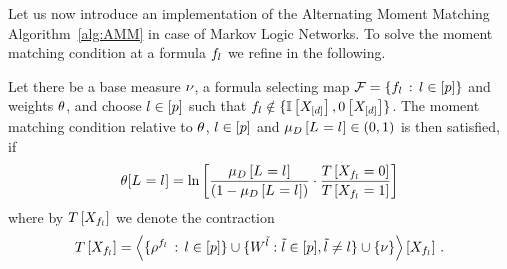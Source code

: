 Let us now introduce an implementation of the Alternating Moment Matching Algorithm~\ref{alg:AMM} in case of Markov Logic Networks.
To solve the moment matching condition at a formula $f_{l}$ we refine  in the following.

\begin{lemma}\label{ref:lemMMinMLN}
	Let there be a base measure $\nu$, a formula selecting map $\mathcal{F}=\{f_{l} \, : \, l\in[p]\}$ and weights $\theta$, and choose $l\in[p]$ such that $f_{l}  \notin \{\mathbb{I}\left[X_{[d]}\right],0\left[X_{[d]}\right]\}$.	
	The moment matching condition relative to $\theta$, $l\in[p]$ and $\mu_{D}\left[L_{}=l_{}\right]\in(0,1)$ is then satisfied, if
	\begin{align} \label{sol:momentMatchingExformula}
	 	\theta[L_{}=l_{}] = \ln \left[ 
		\frac{\mu_{D}\left[L_{}=l_{}\right]}{(1-\mu_{D}\left[L_{}=l_{}\right])} 
		\cdot \frac{T\left[X_{f_{l} }=0\right]}{T\left[X_{f_{l} }=1\right]} 
		 \right] 
	\end{align}
	where by $T\left[X_{f_{l} }\right]$ we denote the contraction 
	\begin{align*}
	 	T\left[X_{f_{l}}\right] 
		= \left\langle \{\rho^{f_{l}} \, : \, l\in[p]\}
		\cup\{W^{\tilde{l}} : \tilde{l} \in [p], \tilde{l}\neq l\}
		\cup\{\nu\}\right\rangle \left[ X_{f_{l}} \right] \, . 
	\end{align*}
\end{lemma}
